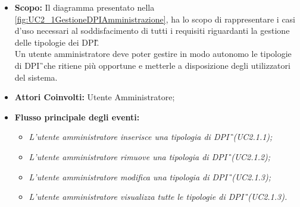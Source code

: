			\begin{itemize}
				\item \textbf{Scopo:} Il diagramma presentato nella \autoref{fig:UC2_1GestioneDPIAmministrazione}, ha lo scopo di rappresentare i casi d'uso necessari al soddisfacimento di tutti i requisiti riguardanti la gestione delle tipologie dei \gls{DPI}\G.
				 \\ Un utente amministratore deve poter gestire in modo autonomo le tipologie di \gls{DPI}\G\ che ritiene più opportune e metterle a disposizione degli utilizzatori del sistema.
				\item \textbf{Attori Coinvolti:} Utente Amministratore;
				\item \textbf{Flusso principale degli eventi:} 
				\begin{itemize}
					\item \textit{L'utente amministratore inserisce una tipologia di \gls{DPI}\G\ (UC2.1.1);}
					\item \textit{L'utente amministratore rimuove una tipologia di \gls{DPI}\G\ (UC2.1.2);}
					\item \textit{L'utente amministratore modifica una tipologia di \gls{DPI}\G\ (UC2.1.3);}
					\item \textit{L'utente amministratore visualizza tutte le tipologie di \gls{DPI}\G\ (UC2.1.3).}
				\end{itemize}
			\end{itemize}
